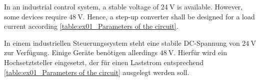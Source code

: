 


In an industrial control system, a stable voltage of $\SI{24}{\volt}$ is available.
However, some devices require $\SI{48}{\volt}$. Hence, a step-up converter shall be designed for a load current according \autoref{table:ex01_Parameters of the circuit}.

\begin{germanblock}
In einem industriellen Steuerungssystem steht eine stabile DC-Spannung von $\SI{24}{\volt}$ zur Verfügung. Einige Geräte benötigen allerdings $\SI{48}{\volt}$. Hierfür wird ein Hochsetztsteller eingesetzt, 
der für einen Laststrom entsprechend \autoref{table:ex01_Parameters of the circuit} ausgelegt werden soll.
\end{germanblock}




